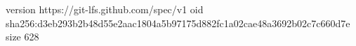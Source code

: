 version https://git-lfs.github.com/spec/v1
oid sha256:d3eb293b2b48d55e2aac1804a5b97175d882fc1a02cae48a3692b02c7c660d7e
size 628
